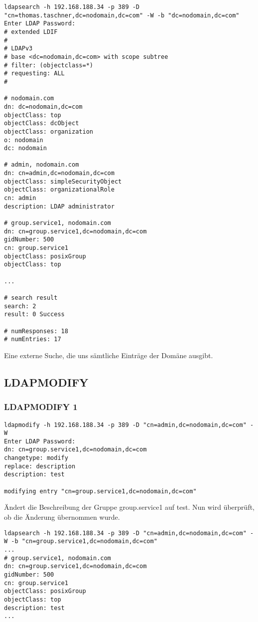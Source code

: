 \begin{lstlisting}[frame=single, caption=LDAPSEARCH 3]
ldapsearch -h 192.168.188.34 -p 389 -D "cn=thomas.taschner,dc=nodomain,dc=com" -W -b "dc=nodomain,dc=com"
Enter LDAP Password: 
# extended LDIF
#
# LDAPv3
# base <dc=nodomain,dc=com> with scope subtree
# filter: (objectclass=*)
# requesting: ALL
#

# nodomain.com
dn: dc=nodomain,dc=com
objectClass: top
objectClass: dcObject
objectClass: organization
o: nodomain
dc: nodomain

# admin, nodomain.com
dn: cn=admin,dc=nodomain,dc=com
objectClass: simpleSecurityObject
objectClass: organizationalRole
cn: admin
description: LDAP administrator

# group.service1, nodomain.com
dn: cn=group.service1,dc=nodomain,dc=com
gidNumber: 500
cn: group.service1
objectClass: posixGroup
objectClass: top

...

# search result
search: 2
result: 0 Success

# numResponses: 18
# numEntries: 17

\end{lstlisting}


Eine externe Suche, die uns sämtliche Einträge der Domäne ausgibt.

\subsection{LDAPMODIFY}
\label{sec:LDAPMODIFY}

\subsubsection{LDAPMODIFY 1}
\label{sec:LDAPMODIFY 1}

\begin{lstlisting}[frame=single, caption=LDAPMODIFY 1]
ldapmodify -h 192.168.188.34 -p 389 -D "cn=admin,dc=nodomain,dc=com" -W
Enter LDAP Password: 
dn: cn=group.service1,dc=nodomain,dc=com
changetype: modify
replace: description
description: test

modifying entry "cn=group.service1,dc=nodomain,dc=com"

\end{lstlisting}

Ändert die Beschreibung der Gruppe group.service1 auf test.
Nun wird überprüft, ob die Änderung übernommen wurde.

\begin{lstlisting}[frame=single, caption=LDAPMODIFY 1 Check]
ldapsearch -h 192.168.188.34 -p 389 -D "cn=admin,dc=nodomain,dc=com" -W -b "cn=group.service1,dc=nodomain,dc=com"
...
# group.service1, nodomain.com
dn: cn=group.service1,dc=nodomain,dc=com
gidNumber: 500
cn: group.service1
objectClass: posixGroup
objectClass: top
description: test
...

\end{lstlisting}

